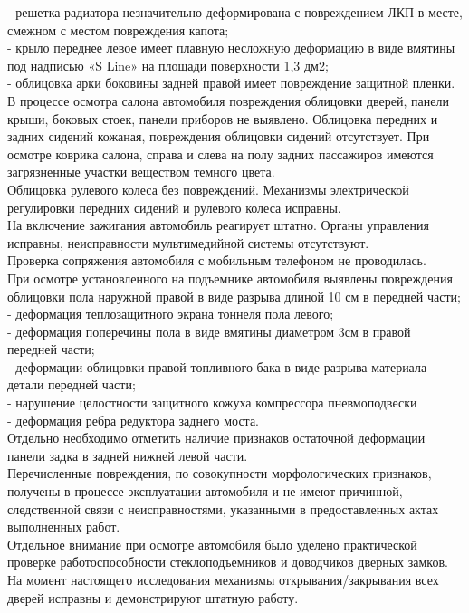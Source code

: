  - решетка радиатора незначительно деформирована с повреждением ЛКП в месте, смежном с местом повреждения капота;\\
 - крыло переднее левое имеет плавную несложную деформацию в виде вмятины  под надписью «S Line» на площади поверхности 1,3 дм2;\\ 
 - облицовка арки боковины задней правой имеет повреждение защитной пленки.\\
В процессе осмотра салона автомобиля повреждения облицовки дверей, панели крыши, боковых стоек, панели приборов не выявлено. Облицовка передних и задних сидений кожаная, повреждения облицовки сидений отсутствует. При осмотре коврика салона, справа и слева на полу задних пассажиров имеются загрязненные участки веществом темного цвета. \\ Облицовка рулевого колеса без повреждений. Механизмы электрической регулировки передних сидений и рулевого колеса исправны.\\
На включение зажигания автомобиль реагирует штатно. Органы управления исправны, неисправности мультимедийной системы отсутствуют.\\ Проверка сопряжения автомобиля с мобильным телефоном не проводилась.\\
При  осмотре установленного на подъемнике автомобиля выявлены повреждения облицовки пола наружной правой в виде разрыва длиной 10 см в передней части;\\  - деформация теплозащитного экрана тоннеля пола левого;\\ - деформация  поперечины пола в виде вмятины диаметром 3см в правой передней части;\\
 - деформации облицовки  правой  топливного бака в виде разрыва материала детали передней части;\\
- нарушение целостности защитного кожуха компрессора пневмоподвески\\ - деформация ребра редуктора заднего моста. \\
Отдельно необходимо отметить наличие признаков остаточной деформации панели задка в задней нижней  левой части.\\
 Перечисленные повреждения, по совокупности морфологических  признаков, получены в процессе эксплуатации автомобиля и не имеют  причинной, следственной связи с неисправностями, указанными в предоставленных актах выполненных работ. \\
 Отдельное внимание при осмотре автомобиля было уделено практической проверке работоспособности стеклоподъемников и доводчиков дверных замков. На момент настоящего исследования механизмы открывания/закрывания всех дверей исправны и демонстрируют штатную работу.\\
